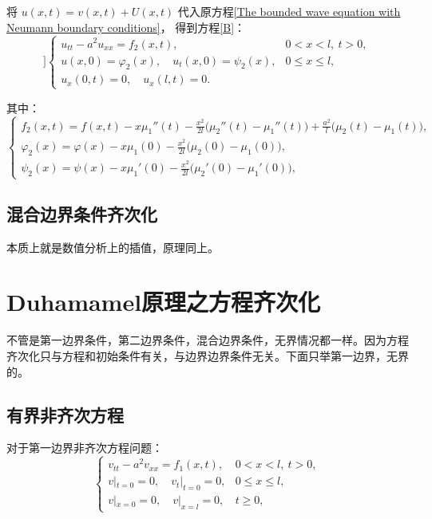 \documentclass[12pt,a4paper]{article}
\numberwithin{subsection}{section}   %
\numberwithin{subsubsection}{subsection}
\theoremstyle{plain}
\theoremstyle{definition}
\theoremstyle{remark}
\theoremstyle{remark}
\begin{document}
		将 \(u(x, t) = v(x, t) + U(x, t)\) 代入原方程\eqref{The bounded wave equation with Neumann boundary conditions}，
		得到方程\eqref{B}：
	    \begin{equation}]\label{B}
		\begin{cases}
			u_{tt} - a^2 u_{xx} = f_2(x, t), & 0 < x < l, \ t > 0, \\
			u(x, 0) = \varphi_2(x), \quad u_t(x, 0) = \psi_2(x), & 0 \leq x \leq l, \\
			u_x(0, t) = 0, \quad u_x(l, t) = 0. &
		\end{cases}
	\end{equation}

其中：
		\begin{equation}
			\begin{cases}
				f_2(x, t) = f(x, t)-x\mu_1''(t) - \frac{x^2}{2l}\big( \mu_2''(t) - \mu_1''(t) \big) + \frac{a^2}{l}\big( \mu_2(t) - \mu_1(t) \big), \\
				\varphi_2(x) = \varphi(x) - x\mu_1(0) - \frac{x^2}{2l}\big( \mu_2(0) - \mu_1(0) \big), \\
			\psi_2(x) = \psi(x) - x\mu_1'(0) - \frac{x^2}{2l}\big( \mu_2'(0) - \mu_1'(0) \big), 
			\end{cases}
		\end{equation}
		
	
		
	\subsection{混合边界条件齐次化}
	本质上就是数值分析上的插值，原理同上。
	
	
	
	
	
	
	
	
		\newpage
	\section{Duhamamel原理之方程齐次化}
不管是第一边界条件，第二边界条件，混合边界条件，无界情况都一样。因为方程齐次化只与方程和初始条件有关，与边界边界条件无关。下面只举第一边界，无界的。
	
	
		\subsection{有界非齐次方程}

		
	对于第一边界非齐次方程问题：
	\begin{equation}
		\begin{cases}
			v_{tt} - a^2 v_{xx} = f_1(x, t), & 0 < x < l, \ t > 0, \\
			v|_{t=0} = 0, \quad v_t|_{t=0} = 0, & 0 \leq x \leq l, \\
			v|_{x=0} = 0, \quad v|_{x=l} = 0, & t \geq 0,
		\end{cases}
	\end{equation}
	
\end{document}
